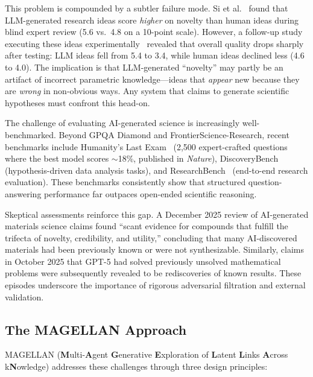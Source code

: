 This problem is compounded by a subtler failure mode. Si et al.~\citep{si2025} found that LLM-generated research ideas score \emph{higher} on novelty than human ideas during blind expert review (5.6 vs.\ 4.8 on a 10-point scale). However, a follow-up study executing these ideas experimentally~\citep{si2025execution} revealed that overall quality drops sharply after testing: LLM ideas fell from 5.4 to 3.4, while human ideas declined less (4.6 to 4.0). The implication is that LLM-generated ``novelty'' may partly be an artifact of incorrect parametric knowledge---ideas that \emph{appear} new because they are \emph{wrong} in non-obvious ways. Any system that claims to generate scientific hypotheses must confront this head-on.

The challenge of evaluating AI-generated science is increasingly well-benchmarked. Beyond GPQA Diamond and FrontierScience-Research, recent benchmarks include Humanity's Last Exam~\citep{phan2025hle} (2,500 expert-crafted questions where the best model scores $\sim$18\%, published in \emph{Nature}), DiscoveryBench~\citep{majumder2024discoverybench} (hypothesis-driven data analysis tasks), and ResearchBench~\citep{liu2025researchbench} (end-to-end research evaluation). These benchmarks consistently show that structured question-answering performance far outpaces open-ended scientific reasoning.

Skeptical assessments reinforce this gap. A December 2025 review of AI-generated materials science claims found ``scant evidence for compounds that fulfill the trifecta of novelty, credibility, and utility,'' concluding that many AI-discovered materials had been previously known or were not synthesizable. Similarly, claims in October 2025 that GPT-5 had solved previously unsolved mathematical problems were subsequently revealed to be rediscoveries of known results. These episodes underscore the importance of rigorous adversarial filtration and external validation.

\subsection{The MAGELLAN Approach}

MAGELLAN (\textbf{M}ulti-\textbf{A}gent \textbf{G}enerative \textbf{E}xploration of \textbf{L}atent \textbf{L}inks \textbf{A}cross k\textbf{N}owledge) addresses these challenges through three design principles:

